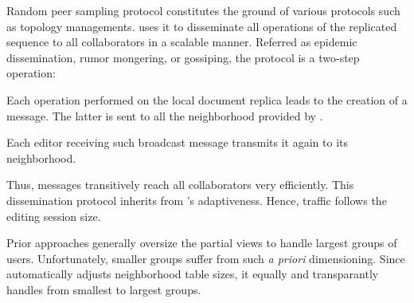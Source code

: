 Random peer sampling protocol constitutes the ground of various protocols such
as topology managements. \CRATE uses it to disseminate all operations of the
replicated sequence to all collaborators in a scalable manner. Referred as
epidemic dissemination, rumor mongering, or gossiping, the protocol is a
two-step operation:
\begin{inparaenum}[(i)]
\item Each operation performed on the local document replica leads to the
  creation of a message. The latter is sent to all the neighborhood provided by
  \SPRAY.
\item Each editor receiving such broadcast message transmits it again to its
  neighborhood.
\end{inparaenum}
Thus, messages transitively reach all collaborators very efficiently.  This
dissemination protocol inherits from \SPRAY's adaptiveness. Hence, traffic
follows the editing session size.

Prior approaches generally oversize the partial views to handle largest groups
of users. Unfortunately, smaller groups suffer from such \emph{a priori}
dimensioning. Since \SPRAY automatically adjusts neighborhood table sizes, it
equally and transparantly handles from smallest to largest groups.

